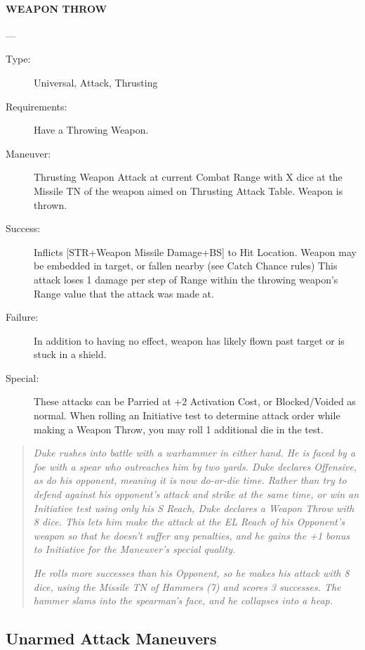 \documentclass[oneside,11pt,english]{book}
\begin{document}
\paragraph{\large\label{man:WEAPON THROW} WEAPON THROW}---\quad{\large[X+1]}
\vspace{-10pt}\begin{description} 
\item [Type:] Universal, Attack, Thrusting 
\item [Requirements:] Have a Throwing Weapon. 
\item [Maneuver:] Thrusting Weapon Attack at current Combat Range with X dice at the Missile TN of the 
weapon aimed on Thrusting Attack Table. Weapon is thrown. 
\item [Success:] Inflicts [STR+Weapon Missile Damage+BS] to Hit Location. Weapon may be embedded in 
target, or fallen nearby (see Catch Chance rules) This attack loses 1 damage per step of Range within the 
throwing weapon’s Range value that the attack was made at. 
\item [Failure:] In addition to having no effect, weapon has likely flown past target or is stuck in a shield. 
\item [Special:] These attacks can be Parried at +2 Activation Cost, or Blocked/Voided as normal. When rolling 
an Initiative test to determine attack order while making a Weapon Throw, you may roll 1 additional die 
in the test.
\end{description}
\begin{quotation}
\emph{Duke rushes into battle with a warhammer in either hand. He is faced by a foe with a spear who outreaches him by two yards. 
Duke declares Offensive, as do his opponent, meaning it is now do-or-die time. Rather than try to defend against his opponent’s 
attack and strike at the same time, or win an Initiative test using only his S Reach, Duke declares a Weapon Throw with 8 dice. 
This lets him make the attack at the EL Reach of his Opponent’s weapon so that he doesn’t suffer any penalties, and he gains the 
+1 bonus to Initiative for the Maneuver’s special quality.}

\emph{He rolls more successes than his Opponent, so he makes his attack with 8 dice, using the Missile TN of Hammers (7) and scores 3 
successes. The hammer slams into the spearman’s face, and he collapses into a heap. }
\end{quotation}


\subsection{Unarmed Attack Maneuvers}
\end{document}

